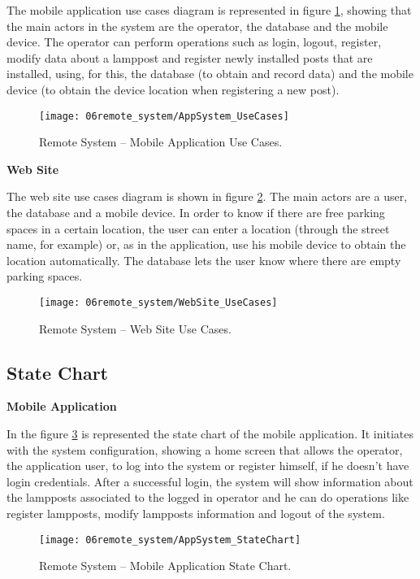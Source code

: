 The mobile application use cases diagram is represented in figure \ref{fig:UseCases_application}, showing that the main actors in the system are the operator, the database and the mobile device. The operator can perform operations such as login, logout, register, modify data about a lamppost and register newly installed posts that are installed, using, for this, the database (to obtain and record data) and the mobile device (to obtain the device location when registering a new post).

\begin{figure}[H]
        \centering
        \texttt{[image: 06remote\_system/AppSystem\_UseCases]}
        \caption{Remote System – Mobile Application Use Cases.}
        \label{fig:UseCases_application}
\end{figure}

\textbf{Web Site}

The web site use cases diagram is shown in figure \ref{fig:UseCases_WebSite}. The main actors are a user, the database and a mobile device. In order to know if there are free parking spaces in a certain location, the user can enter a location (through the street name, for example) or, as in the application, use his mobile device to obtain the location automatically. The database lets the user know where there are empty parking spaces.

\begin{figure}[H]
        \centering
        \texttt{[image: 06remote\_system/WebSite\_UseCases]}
        \caption{Remote System – Web Site Use Cases.}
        \label{fig:UseCases_WebSite}
\end{figure}

\subsection{State Chart}
\textbf{Mobile Application}

In the figure \ref{fig:StateChart_application} is represented the state chart of the mobile application. It initiates with the system configuration, showing a home screen that allows the operator, the application user, to log into the system or register himself, if he doesn’t have login credentials. After a successful login, the system will show information about the lampposts associated to the logged in operator and he can do operations like register lampposts, modify lampposts information and logout of the system.

\begin{figure}[H]
        \centering
        \texttt{[image: 06remote\_system/AppSystem\_StateChart]}
        \caption{Remote System – Mobile Application State Chart.}
        \label{fig:StateChart_application}
\end{figure}

